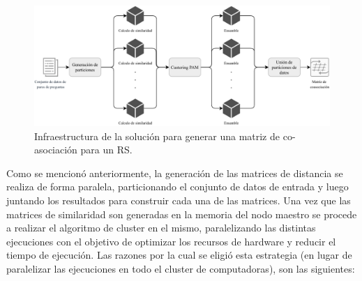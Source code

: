 \begin{figure}[h!]
	\centering
	\includegraphics[width=1\linewidth]{8_problema_investigacion/imagenes/equal_distribuido}
	\caption{Infraestructura de la solución para generar una matriz de co-asociación para un RS.}
	\label{fig:equaldistribuido}
\end{figure}

\bigskip Como se mencionó anteriormente, la generación de las matrices de distancia se realiza de forma paralela, particionando el conjunto de datos de entrada y luego juntando los resultados para construir cada una de las matrices. Una vez que las matrices de similaridad son generadas en la memoria del nodo maestro se procede a realizar el algoritmo de cluster en el mismo, paralelizando las distintas ejecuciones con el objetivo de optimizar los recursos de hardware y reducir el tiempo de ejecución. Las razones por la cual se eligió esta estrategia (en lugar de paralelizar las ejecuciones en todo el cluster de computadoras), son las siguientes:

